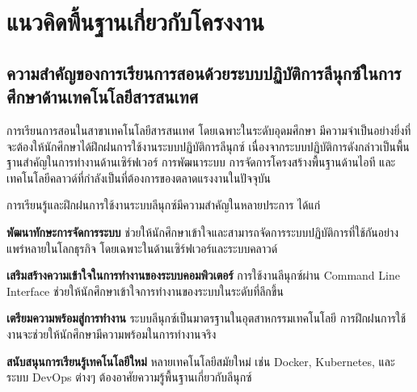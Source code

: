 
\section{แนวคิดพื้นฐานเกี่ยวกับโครงงาน}

\subsection{ความสำคัญของการเรียนการสอนด้วยระบบปฏิบัติการลีนุกซ์ในการศึกษาด้านเทคโนโลยีสารสนเทศ}

\hspace*{1.5em} %
การเรียนการสอนในสาขาเทคโนโลยีสารสนเทศ โดยเฉพาะในระดับอุดมศึกษา มีความจำเป็นอย่างยิ่งที่จะต้องให้นักศึกษาได้ฝึกฝนการใช้งานระบบปฏิบัติการลีนุกซ์ เนื่องจากระบบปฏิบัติการดังกล่าวเป็นพื้นฐานสำคัญในการทำงานด้านเซิร์ฟเวอร์ การพัฒนาระบบ การจัดการโครงสร้างพื้นฐานด้านไอที และเทคโนโลยีคลาวด์ที่กำลังเป็นที่ต้องการของตลาดแรงงานในปัจจุบัน \parencite{anderson2008theory}

\hspace*{1.5em} %
การเรียนรู้และฝึกฝนการใช้งานระบบลีนุกซ์มีความสำคัญในหลายประการ ได้แก่
\begin{mycustomitem}
    \item \textbf{พัฒนาทักษะการจัดการระบบ} ช่วยให้นักศึกษาเข้าใจและสามารถจัดการระบบปฏิบัติการที่ใช้กันอย่างแพร่หลายในโลกธุรกิจ โดยเฉพาะในด้านเซิร์ฟเวอร์และระบบคลาวด์
    \item \textbf{เสริมสร้างความเข้าใจในการทำงานของระบบคอมพิวเตอร์} การใช้งานลีนุกซ์ผ่าน Command Line Interface ช่วยให้นักศึกษาเข้าใจการทำงานของระบบในระดับที่ลึกขึ้น
    \item \textbf{เตรียมความพร้อมสู่การทำงาน} ระบบลีนุกซ์เป็นมาตรฐานในอุตสาหกรรมเทคโนโลยี การฝึกฝนการใช้งานจะช่วยให้นักศึกษามีความพร้อมในการทำงานจริง
    \item \textbf{สนับสนุนการเรียนรู้เทคโนโลยีใหม่} หลายเทคโนโลยีสมัยใหม่ เช่น Docker, Kubernetes, และระบบ DevOps ต่างๆ ต้องอาศัยความรู้พื้นฐานเกี่ยวกับลีนุกซ์ \parencite{lee2021container}
\end{mycustomitem}


